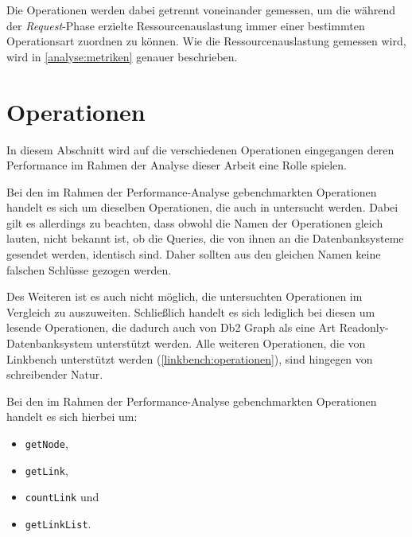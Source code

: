 Die Operationen werden dabei getrennt voneinander gemessen, um die während der \textit{Request}-Phase erzielte Ressourcenauslastung immer einer bestimmten Operationsart zuordnen zu können. Wie die Ressourcenauslastung gemessen wird, wird in \autoref{analyse:metriken} genauer beschrieben.

\section{Operationen}
\label{analyse:operationen}
In diesem Abschnitt wird auf die verschiedenen Operationen eingegangen deren Performance im Rahmen der Analyse dieser Arbeit eine Rolle spielen. 

Bei den im Rahmen der Performance-Analyse gebenchmarkten Operationen handelt es sich um dieselben Operationen, die auch in \cite{sigmod_tian} untersucht werden. Dabei gilt es allerdings zu beachten, dass obwohl die Namen der Operationen gleich lauten, nicht bekannt ist, ob die Queries, die von ihnen an die Datenbanksysteme gesendet werden, identisch sind. Daher sollten aus den gleichen Namen keine falschen Schlüsse gezogen werden. 

Des Weiteren ist es auch nicht möglich, die untersuchten Operationen im Vergleich zu \cite{sigmod_tian} auszuweiten. Schließlich handelt es sich lediglich bei diesen um lesende Operationen, die dadurch auch von Db2 Graph als eine Art Readonly-Datenbanksystem unterstützt werden. Alle weiteren Operationen, die von Linkbench unterstützt werden (\autoref{linkbench:operationen}), sind hingegen von schreibender Natur. 

Bei den im Rahmen der Performance-Analyse gebenchmarkten Operationen handelt es sich hierbei um:
\begin{itemize}
    \item \texttt{getNode},
    \item \texttt{getLink},
    \item \texttt{countLink} und
    \item \texttt{getLinkList}. 
\end{itemize}

